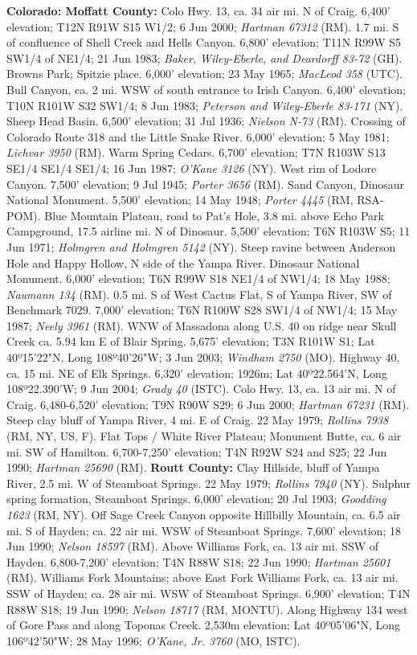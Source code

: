 \textbf{Colorado: Moffatt County:} Colo Hwy. 13, ca. 34 air mi. N of Craig. 6,400' elevation; T12N R91W S15 W1/2; 6 Jun 2000; \textit{Hartman 67312} (RM).  1.7 mi. S of confluence of Shell Creek and Hells Canyon. 6,800' elevation; T11N R99W S5 SW1/4 of NE1/4; 21 Jun 1983; \textit{Baker, Wiley-Eberle, and Deardorff 83-72} (GH).  Browns Park; Spitzie place. 6,000' elevation; 23 May 1965; \textit{MacLeod 358} (UTC).  Bull Canyon, ca. 2 mi. WSW of south entrance to Irish Canyon. 6,400' elevation; T10N R101W S32 SW1/4; 8 Jun 1983; \textit{Peterson and Wiley-Eberle 83-171} (NY).  Sheep Head Basin. 6,500' elevation; 31 Jul 1936; \textit{Nielson N-73} (RM).  Crossing of Colorado Route 318 and the Little Snake River. 6,000' elevation; 5 May 1981; \textit{Lichvar 3950} (RM).  Warm Spring Cedars. 6,700' elevation; T7N R103W S13 SE1/4 SE1/4 SE1/4; 16 Jun 1987; \textit{O'Kane 3126} (NY).  West rim of Lodore Canyon. 7,500' elevation; 9 Jul 1945; \textit{Porter 3656} (RM).  Sand Canyon, Dinosaur National Monument. 5,500' elevation; 14 May 1948; \textit{Porter 4445} (RM, RSA-POM).  Blue Mountain Plateau, road to Pat's Hole, 3.8 mi. above Echo Park Campground, 17.5 airline mi. N of Dinosaur. 5,500' elevation; T6N R103W S5; 11 Jun 1971; \textit{Holmgren and Holmgren 5142} (NY).  Steep ravine between Anderson Hole and Happy Hollow, N side of the Yampa River. Dinosaur National Monument. 6,000' elevation; T6N R99W S18 NE1/4 of NW1/4; 18 May 1988; \textit{Naumann 134} (RM).  0.5 mi. S of West Cactus Flat, S of Yampa River, SW of Benchmark 7029. 7,000' elevation; T6N R100W S28 SW1/4 of NW1/4; 15 May 1987; \textit{Neely 3961} (RM).  WNW of Massadona along U.S. 40 on ridge near Skull Creek ca. 5.94 km E of Blair Spring. 5,675' elevation; T3N R101W S1; Lat 40º15'22"N, Long 108º40'26"W; 3 Jun 2003; \textit{Windham 2750} (MO).  Highway 40, ca. 15 mi. NE of Elk Springs. 6,320' elevation; 1926m; Lat 40º22.564'N, Long 108º22.390'W; 9 Jun 2004; \textit{Grady 40} (ISTC).  Colo Hwy. 13, ca. 13 air mi. N of Craig. 6,480-6,520' elevation; T9N R90W S29; 6 Jun 2000; \textit{Hartman 67231} (RM).  Steep clay bluff of Yampa River, 4 mi. E of Craig. 22 May 1979; \textit{Rollins 7938} (RM, NY, US, F).  Flat Tops / White River Plateau; Monument Butte, ca. 6 air mi. SW of Hamilton. 6,700-7,250' elevation;  T4N R92W S24 and S25; 22 Jun 1990; \textit{Hartman 25690} (RM).  \textbf{Routt County:} Clay Hillside, bluff of Yampa River, 2.5 mi. W of Steamboat Springs. 22 May 1979; \textit{Rollins 7940} (NY).  Sulphur spring formation, Steamboat Springs. 6,000' elevation; 20 Jul 1903; \textit{Goodding 1623} (RM, NY).  Off Sage Creek Canyon opposite Hillbilly Mountain, ca. 6.5 air mi. S of Hayden; ca. 22 air mi. WSW of Steamboat Springs. 7,600' elevation; 18 Jun 1990; \textit{Nelson 18597} (RM).  Above Williams Fork, ca. 13 air mi. SSW of Hayden. 6,800-7,200' elevation; T4N R88W S18; 22 Jun 1990; \textit{Hartman 25601} (RM).  Williams Fork Mountains; above East Fork Williams Fork, ca. 13 air mi. SSW of Hayden; ca. 28 air mi. WSW of Steamboat Springs.   6,900' elevation; T4N R88W S18; 19 Jun 1990; \textit{Nelson 18717} (RM, MONTU).  Along Highway 134 west of Gore Pass and along Toponas Creek. 2,530m elevation; Lat 40º05'06"N, Long 106º42'50"W; 28 May 1996; \textit{O'Kane, Jr. 3760} (MO, ISTC).  